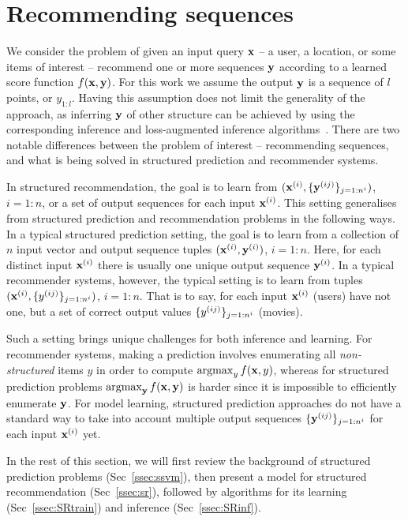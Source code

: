\section{Recommending sequences}
\label{sec:recseq}

We consider the problem of given an input query $\mathbf{x}$ -- a user, a location, or some items of interest -- 
recommend one or more sequences $\mathbf{y}$ according to a learned score function $f(\mathbf{x},\mathbf{y})$. 
For this work we assume the output $\mathbf{y}$ is a sequence of $l$ points, or $y_{1:l}$. 
Having this assumption does not limit the generality of the approach, 
as inferring $\mathbf{y}$ of other structure can be achieved by using the corresponding inference and loss-augmented inference algorithms~\cite{joachims2009predicting}.  %
There are two notable differences between the problem of interest -- recommending sequences, and what is being solved 
in structured prediction and recommender systems. 

In structured recommendation, the goal is to learn from 
$(\mathbf{x}^{({i})}, \{ \mathbf{y}^{({ij})} \}_{j=1:n^i})$, $i=1:n$, or a set of output sequences for each input $\mathbf{x}^{({i})}$. 
This setting generalises from structured prediction and recommendation problems in the following ways. 
In a typical structured prediction setting, the goal is to learn from a collection of $n$
input vector and output sequence tuples $(\mathbf{x}^{({i})}, \mathbf{y}^{({i})})$, $i=1:n$. Here, 
for each distinct input $\mathbf{x}^{({i})}$ there is usually one unique output sequence $\mathbf{y}^{({i})}$. 
In a typical recommender systems, however, the typical setting is to learn from 
tuples $(\mathbf{x}^{({i})}, \{ y^{({ij})} \}_{j=1:n^i})$, $i=1:n$. That is to say, for each input $\mathbf{x}^{({i})}$ (\eg users)
have not one, but a set of correct output values $\{ y^{({ij})} \}_{j=1:n^i}$ (\eg movies). 

Such a setting brings unique challenges for both inference and learning. 
For recommender systems, making a prediction involves enumerating all {\em non-structured} items $y$ in order to compute $\operatorname*{argmax}_y f(\mathbf{x},y)$, whereas for structured prediction problems $\operatorname*{argmax}_{\mathbf{y}} f(\mathbf{x},\mathbf{y})$ is harder since it is impossible to efficiently enumerate $\mathbf{y}$. For model learning, structured prediction approaches do not have a standard way to take into account multiple output sequences $\{ \mathbf{y}^{({ij})} \}_{j=1:n^i}$ for each input $\mathbf{x}^{({i})}$ yet. 

In the rest of this section, we will first review the background of structured prediction problems (Sec~\ref{ssec:ssvm}), then present a model for structured recommendation (Sec~\ref{ssec:sr}), followed by algorithms for its learning (Sec~\ref{ssec:SRtrain}) and inference (Sec~\ref{ssec:SRinf}).

